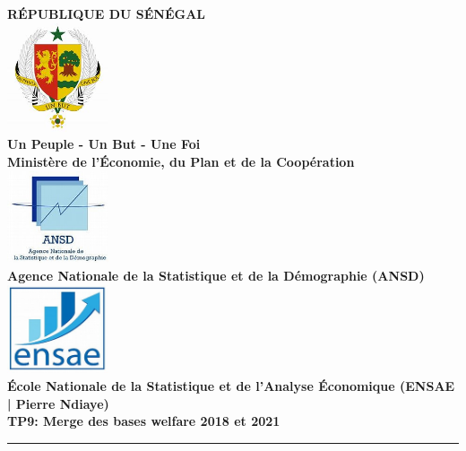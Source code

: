 \documentclass[
]{article}
\author{}
\date{\vspace{-2.5em}}
\begin{document}
\begin{titlepage}
    \begin{center}
        \sffamily 
        {\Large \textbf{RÉPUBLIQUE DU SÉNÉGAL}}\\[0.3cm]
        \includegraphics[width=3cm]{../Donnees/LOGO3.jpg} \\[0.3cm]
        
        {\large \textbf{Un Peuple - Un But - Une Foi}}\\[0.5cm]
        
        {\Large \textbf{Ministère de l'Économie, du Plan et de la Coopération}}\\[0.5cm]
        
        \includegraphics[width=3cm]{../Donnees/LOGO2.jpg} \\[0.3cm]
        
        {\Large \textbf{Agence Nationale de la Statistique et de la Démographie (ANSD)}}\\[0.5cm]
        
        \includegraphics[width=3cm]{../Donnees/LOGO1.jpg} \\[0.3cm]
        
        {\LARGE \textbf{École Nationale de la Statistique et de l'Analyse Économique (ENSAE | Pierre Ndiaye)}}\\[0.8cm]
        
        \textbf{\Huge \color{blue} TP9: Merge des bases welfare 2018 et 2021}\\[0.6cm]
        \rule{\linewidth}{0.6mm} \\[1cm]
        

\end{center}
\end{titlepage}
\end{document}
